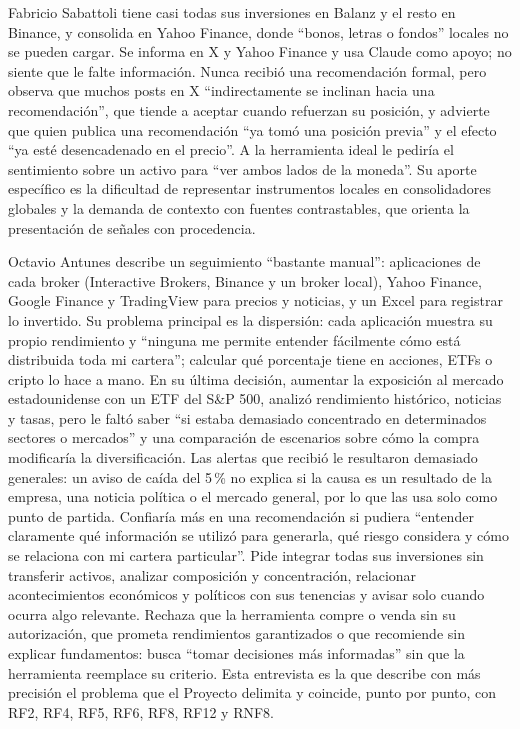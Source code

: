 Fabricio Sabattoli tiene casi todas sus inversiones en Balanz y el resto en Binance, y consolida en Yahoo Finance, donde \enquote{bonos, letras o fondos} locales no se pueden cargar. Se informa en X y Yahoo Finance y usa Claude como apoyo; no siente que le falte información. Nunca recibió una recomendación formal, pero observa que muchos posts en X \enquote{indirectamente se inclinan hacia una recomendación}, que tiende a aceptar cuando refuerzan su posición, y advierte que quien publica una recomendación \enquote{ya tomó una posición previa} y el efecto \enquote{ya esté desencadenado en el precio}. A la herramienta ideal le pediría el sentimiento sobre un activo para \enquote{ver ambos lados de la moneda}. Su aporte específico es la dificultad de representar instrumentos locales en consolidadores globales y la demanda de contexto con fuentes contrastables, que orienta la presentación de señales con procedencia.

Octavio Antunes describe un seguimiento \enquote{bastante manual}: aplicaciones de cada broker (Interactive Brokers, Binance y un broker local), Yahoo Finance, Google Finance y TradingView para precios y noticias, y un Excel para registrar lo invertido. Su problema principal es la dispersión: cada aplicación muestra su propio rendimiento y \enquote{ninguna me permite entender fácilmente cómo está distribuida toda mi cartera}; calcular qué porcentaje tiene en acciones, ETFs o cripto lo hace a mano. En su última decisión, aumentar la exposición al mercado estadounidense con un ETF del S\&P 500, analizó rendimiento histórico, noticias y tasas, pero le faltó saber \enquote{si estaba demasiado concentrado en determinados sectores o mercados} y una comparación de escenarios sobre cómo la compra modificaría la diversificación. Las alertas que recibió le resultaron demasiado generales: un aviso de caída del 5\,\% no explica si la causa es un resultado de la empresa, una noticia política o el mercado general, por lo que las usa solo como punto de partida. Confiaría más en una recomendación si pudiera \enquote{entender claramente qué información se utilizó para generarla, qué riesgo considera y cómo se relaciona con mi cartera particular}. Pide integrar todas sus inversiones sin transferir activos, analizar composición y concentración, relacionar acontecimientos económicos y políticos con sus tenencias y avisar solo cuando ocurra algo relevante. Rechaza que la herramienta compre o venda sin su autorización, que prometa rendimientos garantizados o que recomiende sin explicar fundamentos: busca \enquote{tomar decisiones más informadas} sin que la herramienta reemplace su criterio. Esta entrevista es la que describe con más precisión el problema que el Proyecto delimita y coincide, punto por punto, con RF2, RF4, RF5, RF6, RF8, RF12 y RNF8.

